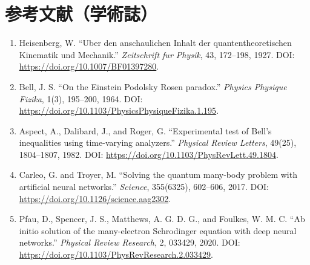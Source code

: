 \section*{参考文献（学術誌）}
\begin{enumerate}[leftmargin=2.4em]
\item Heisenberg, W. ``Uber den anschaulichen Inhalt der quantentheoretischen Kinematik und Mechanik.'' \textit{Zeitschrift fur Physik}, 43, 172--198, 1927. DOI: \url{https://doi.org/10.1007/BF01397280}.
\item Bell, J. S. ``On the Einstein Podolsky Rosen paradox.'' \textit{Physics Physique Fizika}, 1(3), 195--200, 1964. DOI: \url{https://doi.org/10.1103/PhysicsPhysiqueFizika.1.195}.
\item Aspect, A., Dalibard, J., and Roger, G. ``Experimental test of Bell's inequalities using time-varying analyzers.'' \textit{Physical Review Letters}, 49(25), 1804--1807, 1982. DOI: \url{https://doi.org/10.1103/PhysRevLett.49.1804}.
\item Carleo, G. and Troyer, M. ``Solving the quantum many-body problem with artificial neural networks.'' \textit{Science}, 355(6325), 602--606, 2017. DOI: \url{https://doi.org/10.1126/science.aag2302}.
\item Pfau, D., Spencer, J. S., Matthews, A. G. D. G., and Foulkes, W. M. C. ``Ab initio solution of the many-electron Schrodinger equation with deep neural networks.'' \textit{Physical Review Research}, 2, 033429, 2020. DOI: \url{https://doi.org/10.1103/PhysRevResearch.2.033429}.
\end{enumerate}
